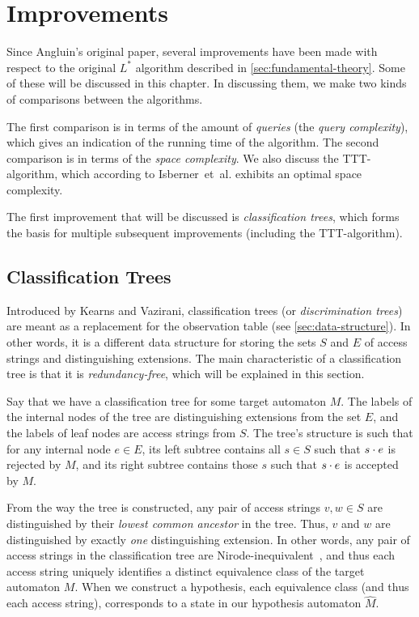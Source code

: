 \documentclass[multi,crop=false,class=article]{standalone}
\begin{document}
\section{Improvements}
\label{sec:improvements}
Since Angluin's original paper, several improvements have been made with respect
to the original $L^*$ algorithm described in \cref{sec:fundamental-theory}.
Some of these will be discussed in this chapter.
In discussing them, we make two kinds of comparisons between the algorithms.

The first comparison is in terms of the amount of
\textit{queries} (the \textit{query complexity}), which gives an indication of
the running time of the algorithm.
The second comparison is in terms of the \textit{space complexity}.
We also discuss the TTT-algorithm, which according
to Isberner~et~al. exhibits an optimal space complexity\cite{Isberner2014b}.

The first improvement that will be discussed is \textit{classification trees},
which forms the basis for multiple subsequent improvements (including
the TTT-algorithm).

\subsection{Classification Trees}
\label{sec:classification-trees}
Introduced by Kearns and Vazirani\cite{Kearns1994}, classification trees (or
\textit{discrimination trees}) are meant as a replacement for the observation
table (see \cref{sec:data-structure}). In other words, it is a different data
structure for storing the sets $S$ and $E$ of access strings and distinguishing
extensions. The main characteristic of a classification tree is that it is
\textit{redundancy-free}, which will be explained in this section.

Say that we have a classification tree for some target automaton $M$. The labels
of the internal nodes of the tree are distinguishing extensions from the set
$E$, and the labels of leaf nodes are access strings from $S$. The tree's
structure is such that for any internal node $e \in E$, its left subtree
contains all $s \in S$ such that $s \cdot e$ is rejected by $M$, and its right
subtree contains those $s$ such that $s \cdot e$ is accepted by $M$.

From the way the tree is constructed, any pair of access strings $v,w \in S$ are
distinguished by their \textit{lowest common ancestor} in the tree. Thus, $v$
and $w$ are distinguished by exactly \textit{one} distinguishing extension. In
other words, any pair of access strings in the classification tree are
Nirode-inequivalent~, and thus each access
string uniquely identifies a distinct equivalence class of the target automaton
$M$. When we construct a hypothesis, each equivalence class (and thus each
access string), corresponds to a state in our hypothesis automaton $\hat M$.
\end{document}
